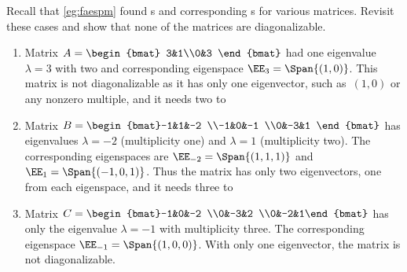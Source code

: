 \begin{example}
\begin{solution}
\end{solution}
\end{example}





\begin{example} \label{eg:faespmp}
Recall that \cref{eg:faespm} found s and corresponding s for various matrices.
Revisit these cases and show that none of the matrices are diagonalizable.
\begin{enumerate}
\item Matrix \(A=\begin{bmat} 3&1\\0&3 \end{bmat}\) had one eigenvalue \(\lambda=3\) with  two and corresponding eigenspace \(\EE_3=\Span\{(1,0)\}\).
This matrix is not diagonalizable as it has only one  eigenvector, such as~\((1,0)\) or any nonzero multiple, and it needs two to 

\item Matrix \(B=\begin{bmat}-1&1&-2
\\-1&0&-1
\\0&-3&1 \end{bmat}\)
has eigenvalues  \(\lambda=-2\) (multiplicity one) and \(\lambda=1\) (multiplicity two).
The corresponding eigenspaces are \(\EE_{-2}=\Span\{(1,1,1)\}\) and \(\EE_{1}=\Span\{(-1,0,1)\}\).
Thus the matrix has only two  eigenvectors, one from each eigenspace, and it needs three to 

\item Matrix \(C=\begin{bmat}-1&0&-2
\\0&-3&2
\\0&-2&1\end{bmat}\)
has only the eigenvalue \(\lambda=-1\) with multiplicity three.
The corresponding eigenspace \(\EE_{-1}=\Span\{(1,0,0)\}\).
With only one  eigenvector, the matrix is not diagonalizable.
\aqed

\end{enumerate}
\end{example}


